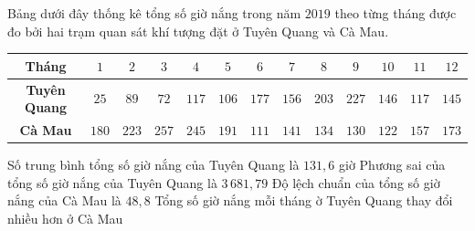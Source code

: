 \begin{ex}%
	Bảng dưới đây thống kê tổng số giờ nắng trong năm $2019$ theo từng tháng được đo bởi hai trạm quan sát khí tượng đặt ở Tuyên Quang và Cà Mau.
	\begin{center} 
		\begin{tabular}{|c|c|c|c|c|c|c|c|c|c|c|c|c|} 
			\hline 
			\textbf{Tháng} & $ 1$ & $2$ & $3$ & $4$ & $5$ & $6$ & $7$ & $8$ & $9$ & $10$ & $11$ & $12$\\ 
			\hline 
			\textbf{Tuyên Quang} & $25$ & $89$ & $72$ & $117$ & $106$ & $177$ & $156$ & $203$ & $227$ & $146$ & $117$ & $145$\\ 
			\hline 
			\textbf{Cà Mau} & $180$ & $223$ & $257$ & $245$ & $191$ & $111$ & $141$ & $134$ & $130$ & $122$ & $157$ & $173$\\ 
			\hline 
		\end{tabular}
	\end{center}
	\choiceTF
	{\True Số trung bình tổng số giờ nắng của Tuyên Quang là $131{,}6$ giờ }
	{Phương sai của tổng số giờ nắng của Tuyên Quang là $3\,681,79$}
	{\True Độ lệch chuẩn của tổng số giờ nắng của Cà Mau là $48,8$}
	{\True Tổng số giờ nắng mỗi tháng ờ Tuyên Quang thay đổi nhiều hơn ở Cà Mau}
\end{ex}
